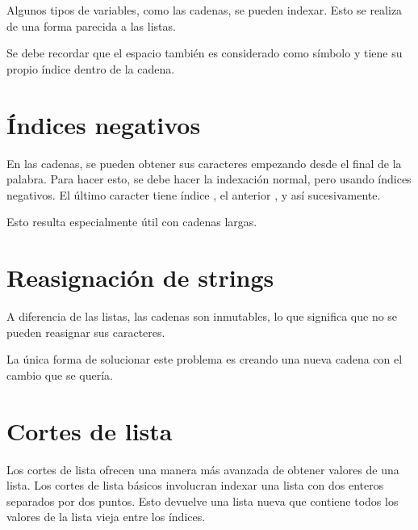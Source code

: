 Algunos tipos de variables, como las cadenas, se pueden indexar. Esto se realiza de una forma parecida a las listas.


Se debe recordar que el espacio \ttt{\qq  \qq} también es considerado como símbolo y tiene su propio índice dentro de la cadena.

\section{Índices negativos}

En las cadenas, se pueden obtener sus caracteres empezando desde el final de la palabra.
Para hacer esto, se debe hacer la indexación normal, pero usando índices negativos.
El último caracter tiene índice , el anterior , y así sucesivamente.


Esto resulta especialmente útil con cadenas largas.

\section{Reasignación de strings}

A diferencia de las listas, las cadenas son inmutables, lo que significa que no se pueden reasignar sus caracteres.


La única forma de solucionar este problema es creando una nueva cadena con el cambio que se quería.


\section{Cortes de lista}

Los cortes de lista ofrecen una manera más avanzada de obtener valores de una lista.
Los cortes de lista básicos involucran indexar una lista con dos enteros separados por dos puntos.
Esto devuelve una lista nueva que contiene todos los valores de la lista vieja entre los índices.

